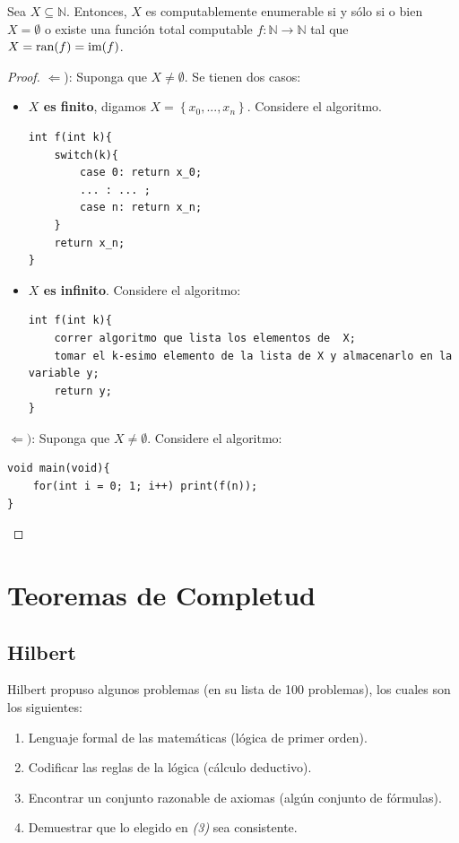 \documentclass[12pt]{report}
\newcounter{it}
\theoremstyle{largebreak}
\newcommand\cf[3]{\ensuremath{#1:#2\rightarrow#3}}
\begin{document}
    \begin{theor}
        Sea $X\subseteq\mathbb{N}$. Entonces, $X$ es computablemente enumerable si y sólo si o bien $X=\emptyset$ o existe una función total computable $\cf{f}{\mathbb{N}}{\mathbb{N}}$ tal que $X=\textup{ran}(f)=\textup{im}(f)$.
    \end{theor}

    \begin{proof}
        $\Leftarrow$): Suponga que $X\neq\emptyset$. Se tienen dos casos:
        \begin{itemize}
            \item \textbf{$X$ es finito}, digamos $X=\left\{x_0,...,x_n \right\}$. Considere el algoritmo.
            \begin{lstlisting}
int f(int k){
    switch(k){
        case 0: return x_0;
        ... : ... ;
        case n: return x_n;
    }
    return x_n;
}
            \end{lstlisting}
            \item \textbf{$X$ es infinito}. Considere el algoritmo:
            \begin{lstlisting}
int f(int k){
    correr algoritmo que lista los elementos de  X;
    tomar el k-esimo elemento de la lista de X y almacenarlo en la variable y;
    return y;
}
            \end{lstlisting}
        \end{itemize}

        $\Leftarrow)$: Suponga que $X\neq\emptyset$. Considere el algoritmo:
        \begin{lstlisting}
void main(void){
    for(int i = 0; 1; i++) print(f(n));
}
        \end{lstlisting}
    \end{proof}

    \chapter{Teoremas de Completud}

    \section{Hilbert}

    Hilbert propuso algunos problemas (en su lista de 100 problemas), los cuales son los siguientes:
    
    \begin{enumerate}[label = \textit{(\arabic*)}]
        \item Lenguaje formal de las matemáticas (lógica de primer orden).
        \item Codificar las reglas de la lógica (cálculo deductivo).
        \item Encontrar un conjunto razonable de axiomas (algún conjunto de fórmulas).
        \item Demuestrar que lo elegido en \textit{(3)} sea consistente.
    \end{enumerate}
\end{document}
